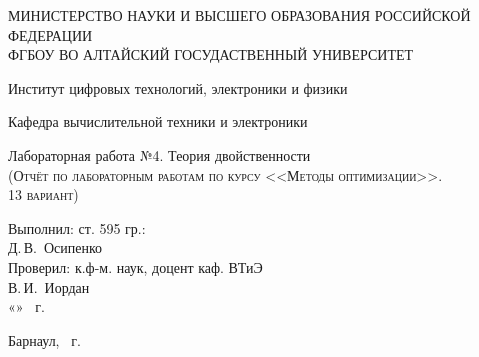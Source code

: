 \documentclass[a4paper, 12pt]{article}
\begin{document}
\begin{titlepage}
  \begin{center}
    \MakeUppercase{Министерство науки и высшего образования Российской Федерации} \\
    \MakeUppercase{ФГБОУ ВО Алтайский госудаственный университет}
    \vspace{0.25cm}
    
	  Институт цифровых технологий, электроники и физики
    
    Кафедра вычислительной техники и электроники
    \vfill
    
    {\LARGE Лабораторная работа №4. Теория двойственности}\\[5mm]
    \textsc{(Отчёт по лабораторным работам по курсу <<Методы оптимизации>>. \\13 вариант)}
  \bigskip

\end{center}
\vfill

\newlength{\ML}
\hfill
\begin{minipage}{0.45\textwidth}
  Выполнил: ст. 595 гр.:\\
  \underline{\hspace{\ML}} Д.\,В.~Осипенко\\
  Проверил: к.ф-м. наук, доцент каф. ВТиЭ\\
  \underline{\hspace{\ML}} В.\,И.~Иордан\\
  «\underline{\hspace{0.7cm}}» \underline{\hspace{2cm}} \the\year~г.
\end{minipage}%
\vfill

\begin{center}
  Барнаул, \the\year~г.
\end{center}
\end{titlepage}

\newpage
\end{document}
